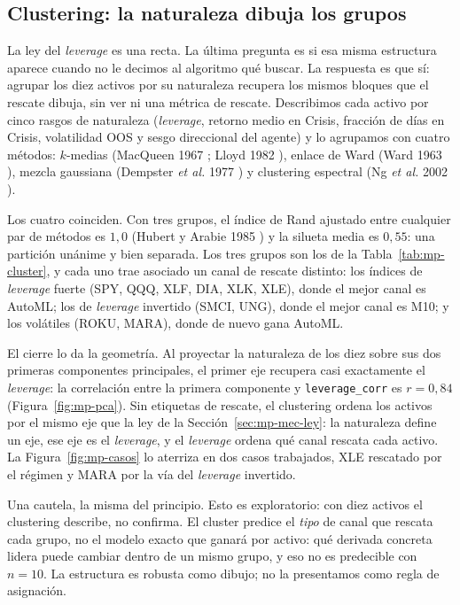 \subsection{Clustering: la naturaleza dibuja los grupos}
\label{sec:mp-clustering}

La ley del \emph{leverage} es una recta. La última pregunta es si esa misma estructura aparece cuando no le decimos al algoritmo qué buscar. La respuesta es que sí: agrupar los diez activos por su naturaleza recupera los mismos bloques que el rescate dibuja, sin ver ni una métrica de rescate. Describimos cada activo por cinco rasgos de naturaleza (\emph{leverage}, retorno medio en Crisis, fracción de días en Crisis, volatilidad OOS y sesgo direccional del agente) y lo agrupamos con cuatro métodos: $k$-medias (MacQueen 1967 \cite{macqueen1967}; Lloyd 1982 \cite{lloyd1982}), enlace de Ward (Ward 1963 \cite{ward1963}), mezcla gaussiana (Dempster \emph{et al.} 1977 \cite{dempster1977}) y clustering espectral (Ng \emph{et al.} 2002 \cite{ng2002spectral}).

Los cuatro coinciden. Con tres grupos, el índice de Rand ajustado entre cualquier par de métodos es $1{,}0$ (Hubert y Arabie 1985 \cite{hubert1985}) y la silueta media es $0{,}55$: una partición unánime y bien separada. Los tres grupos son los de la Tabla~\ref{tab:mp-cluster}, y cada uno trae asociado un canal de rescate distinto:
los índices de \emph{leverage} fuerte (SPY, QQQ, XLF, DIA, XLK, XLE), donde el mejor canal es AutoML;
los de \emph{leverage} invertido (SMCI, UNG), donde el mejor canal es M10;
y los volátiles (ROKU, MARA), donde de nuevo gana AutoML.

El cierre lo da la geometría. Al proyectar la naturaleza de los diez sobre sus dos primeras componentes principales, el primer eje recupera casi exactamente el \emph{leverage}: la correlación entre la primera componente y \texttt{leverage\_corr} es $r = 0{,}84$ (Figura~\ref{fig:mp-pca}). Sin etiquetas de rescate, el clustering ordena los activos por el mismo eje que la ley de la Sección~\ref{sec:mp-mec-ley}: la naturaleza define un eje, ese eje es el \emph{leverage}, y el \emph{leverage} ordena qué canal rescata cada activo. La Figura~\ref{fig:mp-casos} lo aterriza en dos casos trabajados, XLE rescatado por el régimen y MARA por la vía del \emph{leverage} invertido.

Una cautela, la misma del principio. Esto es exploratorio: con diez activos el clustering describe, no confirma. El cluster predice el \emph{tipo} de canal que rescata cada grupo, no el modelo exacto que ganará por activo: qué derivada concreta lidera puede cambiar dentro de un mismo grupo, y eso no es predecible con $n = 10$. La estructura es robusta como dibujo; no la presentamos como regla de asignación.

